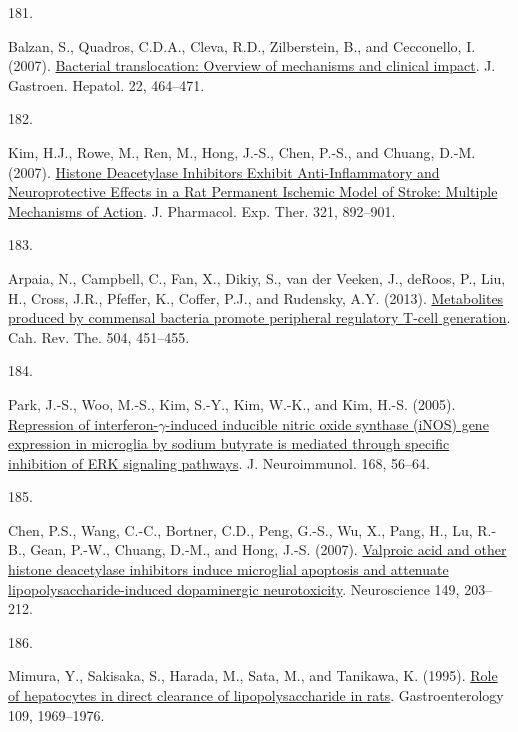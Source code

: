 \documentclass[
]{article}
\newlength{\cslhangindent}
\newlength{\csllabelwidth}
\newlength{\cslentryspacingunit} %
\newenvironment{CSLReferences}[2] %
 {%
  \setlength{\parindent}{0pt}
  \ifodd #1
  \let\oldpar\par
  \def\par{\hangindent=\cslhangindent\oldpar}
  \fi
  \setlength{\parskip}{#2\cslentryspacingunit}
 }%
 {}
\newcommand{\CSLLeftMargin}[1]{\parbox[t]{\csllabelwidth}{#1}}
\newcommand{\CSLRightInline}[1]{\parbox[t]{\linewidth - \csllabelwidth}{#1}\break}
\begin{document}
\begin{CSLReferences}{0}{0}
\leavevmode{}%
\CSLLeftMargin{181. }
\CSLRightInline{Balzan, S., Quadros, C.D.A., Cleva, R.D., Zilberstein, B., and Cecconello, I. (2007). \href{https://doi.org/10.1111/j.1440-1746.2007.04933.x}{Bacterial translocation: {Overview} of mechanisms and clinical impact}. J. Gastroen. Hepatol. 22, 464--471.}

\leavevmode{}%
\CSLLeftMargin{182. }
\CSLRightInline{Kim, H.J., Rowe, M., Ren, M., Hong, J.-S., Chen, P.-S., and Chuang, D.-M. (2007). \href{https://doi.org/10.1124/jpet.107.120188}{Histone {Deacetylase Inhibitors Exhibit Anti-Inflammatory} and {Neuroprotective Effects} in a {Rat Permanent Ischemic Model} of {Stroke}: {Multiple Mechanisms} of {Action}}. J. Pharmacol. Exp. Ther. 321, 892--901.}

\leavevmode{}%
\CSLLeftMargin{183. }
\CSLRightInline{Arpaia, N., Campbell, C., Fan, X., Dikiy, S., van der Veeken, J., deRoos, P., Liu, H., Cross, J.R., Pfeffer, K., Coffer, P.J., and Rudensky, A.Y. (2013). \href{https://doi.org/10.1038/nature12726}{Metabolites produced by commensal bacteria promote peripheral regulatory {T-cell} generation}. Cah. Rev. The. 504, 451--455.}

\leavevmode{}%
\CSLLeftMargin{184. }
\CSLRightInline{Park, J.-S., Woo, M.-S., Kim, S.-Y., Kim, W.-K., and Kim, H.-S. (2005). \href{https://doi.org/10.1016/j.jneuroim.2005.07.003}{Repression of interferon-{\(\gamma\)}-induced inducible nitric oxide synthase ({iNOS}) gene expression in microglia by sodium butyrate is mediated through specific inhibition of {ERK} signaling pathways}. J. Neuroimmunol. 168, 56--64.}

\leavevmode{}%
\CSLLeftMargin{185. }
\CSLRightInline{Chen, P.S., Wang, C.-C., Bortner, C.D., Peng, G.-S., Wu, X., Pang, H., Lu, R.-B., Gean, P.-W., Chuang, D.-M., and Hong, J.-S. (2007). \href{https://doi.org/10.1016/j.neuroscience.2007.06.053}{Valproic acid and other histone deacetylase inhibitors induce microglial apoptosis and attenuate lipopolysaccharide-induced dopaminergic neurotoxicity}. Neuroscience 149, 203--212.}

\leavevmode{}%
\CSLLeftMargin{186. }
\CSLRightInline{Mimura, Y., Sakisaka, S., Harada, M., Sata, M., and Tanikawa, K. (1995). \href{https://doi.org/10.1016/0016-5085(95)90765-3}{Role of hepatocytes in direct clearance of lipopolysaccharide in rats}. Gastroenterology 109, 1969--1976.}


\end{CSLReferences}
\end{document}
